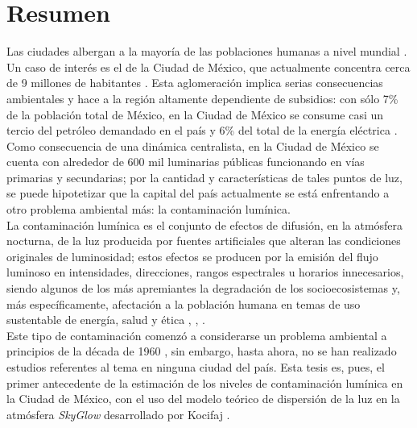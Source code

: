 \chapter{Resumen}

Las ciudades albergan a la mayoría de las poblaciones humanas a nivel mundial \citep{Zari2018}. Un caso de interés es el de la Ciudad de México, que actualmente concentra cerca de 9 millones de habitantes \citep{INEGI2015}. Esta aglomeración implica serias consecuencias ambientales y hace a la región altamente dependiente de subsidios: con sólo 7\% de la población total de México, en la Ciudad de México se consume casi un tercio del petróleo demandado en el país y 6\% del total de la energía eléctrica \citep{SENER2013}.\\

Como consecuencia de una dinámica centralista, en la Ciudad de México se cuenta con alrededor de 600 mil luminarias públicas funcionando en vías primarias y secundarias; por la cantidad y características de tales puntos de luz, se puede hipotetizar que la capital del país actualmente se está enfrentando a otro problema ambiental más: la contaminación lumínica.\\

La contaminación lumínica es el conjunto de efectos de difusión, en la atmósfera nocturna, de la luz producida por fuentes artificiales que alteran las condiciones originales de luminosidad; estos efectos se producen por la emisión del flujo luminoso en intensidades, direcciones, rangos espectrales u horarios innecesarios, siendo algunos de los más apremiantes la degradación de los socioecosistemas y, más específicamente, afectación a la población humana en temas de uso sustentable de energía, salud y ética \citep{AtlasREPSA}, \citep{LibroCL}, \citep{Stone2017}.\\

Este tipo de contaminación comenzó a considerarse un problema ambiental a principios de la década de 1960 \citep{LibroCL}, sin embargo, hasta ahora, no se han realizado estudios referentes al tema en ninguna ciudad del país. Esta tesis es, pues, el primer antecedente de la estimación de los niveles de contaminación lumínica en la Ciudad de México, con el uso del modelo teórico de dispersión de la luz en la atmósfera \textit{SkyGlow} desarrollado por Kocifaj \citep{Kocifaj2007}.

